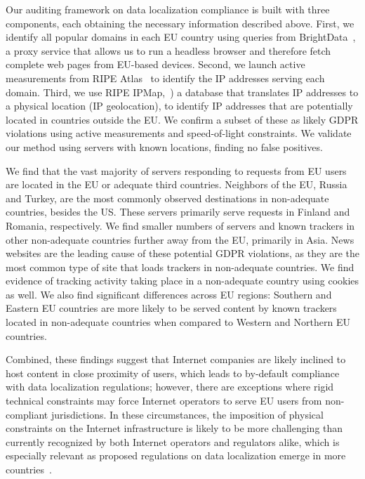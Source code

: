 Our auditing framework on data localization compliance is built with 
three components, each obtaining the necessary information described above. 
First, we identify all popular domains in each EU country using queries from BrightData~\cite{BrightData}, 
a proxy service that allows us to run a headless browser and therefore fetch complete web pages
from EU-based devices. 
Second, we launch active measurements from RIPE Atlas~\cite{RipeAtlasInfo} 
to identify the IP addresses serving each domain. Third, we use RIPE IPMap,~\cite{10.1145/3402413.3402415}) 
a database that translates IP addresses to a 
physical location (IP geolocation),
to identify IP addresses 
that are potentially located in countries 
outside the EU. We confirm a subset of these as likely 
GDPR violations using active measurements and speed-of-light constraints.
We validate our method using servers with known locations,
finding no false positives.

We find that the vast majority of servers responding to requests from EU users are 
located in the EU or adequate third countries. %
Neighbors of the EU, Russia and Turkey, are the most commonly observed destinations 
in non-adequate countries, besides the US. These servers
primarily serve requests in Finland and Romania, respectively.
We find smaller numbers of servers and known trackers in other non-adequate countries
further away from the EU, primarily in Asia.
News websites are the leading cause of these potential GDPR violations,
as they are the most common type of site
that loads trackers in non-adequate countries.
We find evidence of tracking activity taking place in a non-adequate 
country using cookies as well.
We also find significant differences across EU regions: Southern and Eastern EU
countries are more likely to be served content by known trackers located in 
non-adequate countries when compared to Western and Northern EU countries.

Combined, these findings suggest that Internet companies are likely inclined to host content 
in close proximity of users, which leads to by-default compliance with data localization 
regulations; however, there are exceptions where rigid technical constraints
may force Internet operators to serve EU users from non-compliant jurisdictions. 
In these circumstances, the imposition of physical constraints on the Internet infrastructure
is likely to be more challenging than currently recognized by both Internet operators and regulators alike,
which is especially relevant as proposed regulations on data localization emerge in more 
countries~\cite{Indiasd23:online,Dataloca93:online}. 

